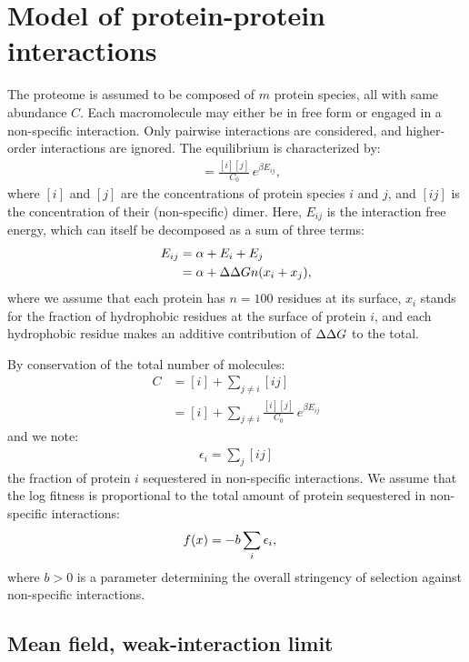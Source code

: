 \section{Model of protein-protein interactions}
\label{sec:model-of-protein-protein-interactions}

The proteome is assumed to be composed of $m$ protein species, all with same abundance $C$.
Each macromolecule may either be in free form or engaged in a non-specific interaction.
Only pairwise interactions are considered, and higher-order interactions are ignored.
The equilibrium is characterized by:
\begin{align}
[ij] & = \frac{[i][j]}{C_0} \, e^{\beta E_{ij}},
\end{align}
where $[i]$ and $[j]$ are the concentrations of protein species $i$ and $j$, and $[ij]$ is the concentration of their (non-specific) dimer. Here, $E_{ij}$ is the interaction free energy, which can itself be decomposed as a sum of three terms:
\begin{align}
E_{ij} & = \alpha + E_i + E_j
\\
& = \alpha + \Delta \Delta G n (x_i + x_j),
\end{align}
where we assume that each protein has $n=100$ residues at its surface, $x_i$ stands for the fraction of hydrophobic residues at the surface of protein $i$, and each hydrophobic residue makes an additive contribution of $\Delta \Delta G$ to the total.

By conservation of the total number of molecules:
\begin{align}
C & = [i] + \sum\limits_{j \neq i} [ij] \\
& = [i] + \sum\limits_{j \neq i} \frac{[i][j]}{C_0} \, e^{\beta E_{ij}}
\end{align}
and we note:
\begin{align}
\epsilon_i = \sum_j [ij]
\end{align}
the fraction of protein $i$ sequestered in non-specific interactions.
We assume that the log fitness is proportional to the total amount of protein sequestered in non-specific interactions:
\begin{align}
f (x) & = -b \sum_i \epsilon_i,
\end{align}
where $b>0$ is a parameter determining the overall stringency of selection against non-specific interactions.

\subsection{Mean field, weak-interaction limit}
\label{subsec:mean-field-interaction-limit}

